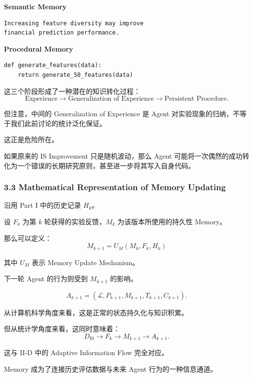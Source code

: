 \textbf{Semantic Memory}

\begin{verbatim}
Increasing feature diversity may improve
financial prediction performance.
\end{verbatim}

\textbf{Procedural Memory}

\begin{verbatim}
def generate_features(data):
    return generate_50_features(data)
\end{verbatim}

这三个阶段形成了一种潜在的知识转化过程：
\[\text{Experience}
\longrightarrow
\text{Generalization of Experience}
\longrightarrow
\text{Persistent Procedure}.\]

但注意，中间的 Generalization of Experience 是 Agent 对实验现象的归纳，不等于我们此前讨论的统计泛化保证。

这正是危险所在。

如果原来的 IS Improvement 只是随机波动，那么 Agent 可能将一次偶然的成功转化为一个错误的长期研究原则，甚至进一步将其写入自身代码。

\hypertarget{part-3-34-0001-mathematical-representation-of-memory-updating}{%
\subsubsection{3.3 Mathematical Representation of Memory Updating}\label{part-3-34-0001-mathematical-representation-of-memory-updating}}

沿用 Part I 中的历史记录 \(H_k\)。

设 \(F_k\) 为第 \(k\) 轮获得的实验反馈，\(M_k\) 为该版本所使用的持久性 Memory。

那么可以定义：
\[\boxed{
M_{k+1}
=
U_M(M_k,F_k,H_k)
}\]

其中 \(U_M\) 表示 Memory Update Mechanism。

下一轮 Agent 的行为则受到 \(M_{k+1}\) 的影响。

\[A_{k+1}
=
(\mathcal L,P_{k+1},M_{k+1},T_{k+1},C_{k+1}).\]

从计算机科学角度来看，这是正常的状态持久化与知识积累。

但从统计学角度来看，这同时意味着：
\[D_{\mathrm{IS}}
\longrightarrow F_k
\longrightarrow M_{k+1}
\longrightarrow A_{k+1}.\]

这与 II-D 中的 Adaptive Information Flow 完全对应。

Memory 成为了连接历史评估数据与未来 Agent 行为的一种信息通道。

